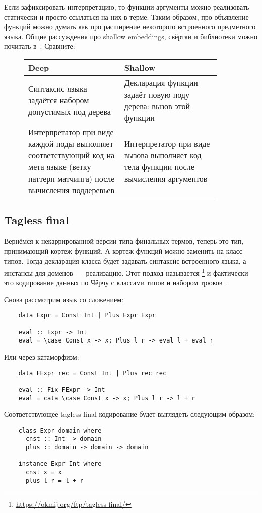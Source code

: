 Если зафиксировать интерпретацию, то функции-аргументы можно реализовать статически и просто ссылаться на них в терме.
Таким образом, про объявление функций можно думать как про расширение некоторого встроенного предметного языка.
Общие рассуждения про shallow embeddings, свёртки и библиотеки можно почитать в~\cite{gibbons2013functional, gibbons2014folding}.
Сравните:
\begin{figure}[h]
    \centering
    \begin{tabular}{|p{0.45\linewidth}|p{0.45\linewidth}|}
        \hline
        Deep                                                                                                                                 & Shallow                                                                              \\
        \hline
        Синтаксис языка задаётся набором допустимых нод дерева                                                                               & Декларация функции задаёт новую ноду дерева: вызов этой функции                      \\
        \hline
        Интерпретатор при виде каждой ноды выполняет соответствующий код на мета-языке (ветку паттерн-матчинга) после вычисления поддеревьев & Интерпретатор при виде вызова выполняет код тела функции после вычисления аргументов \\
        \hline
    \end{tabular}
\end{figure}

\subsection{Tagless final}

Вернёмся к некаррированной версии типа финальных термов, теперь это тип, принимающий кортеж функций.
А кортеж функций можно заменить на класс типов.
Тогда декларация класса будет задавать синтаксис встроенного языка, а инстансы для доменов~--- реализацию.
Этот подход называется \footnote{\url{https://okmij.org/ftp/tagless-final/}} и фактически это кодирование данных по Чёрчу с классами типов и набором трюков~\cite{carette2007finally, kiselyov2012typed}.

Снова рассмотрим язык со сложением:
\begin{verbatim}
    data Expr = Const Int | Plus Expr Expr

    eval :: Expr -> Int
    eval = \case Const x -> x; Plus l r -> eval l + eval r
\end{verbatim}
Или через катаморфизм:
\begin{verbatim}
    data FExpr rec = Const Int | Plus rec rec

    eval :: Fix FExpr -> Int
    eval = cata \case Const x -> x; Plus l r -> l + r
\end{verbatim}
Соответствующее tagless final кодирование будет выглядеть следующим образом:
\begin{verbatim}
    class Expr domain where
      cnst :: Int -> domain
      plus :: domain -> domain -> domain

    instance Expr Int where
      cnst x = x
      plus l r = l + r
\end{verbatim}

